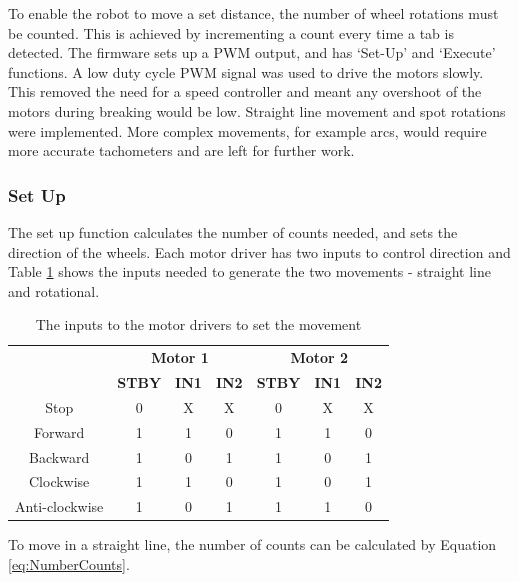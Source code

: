 To enable the robot to move a set distance, the number of wheel rotations must be counted. This is achieved by incrementing a count every time a tab is detected. The firmware sets up a PWM output, and has `Set-Up' and `Execute' functions. A low duty cycle PWM signal was used to drive the motors slowly. This removed the need for a speed controller and meant any overshoot of the motors during breaking would be low. Straight line movement and spot rotations were implemented. More complex movements, for example arcs, would require more accurate tachometers and are left for further work. %

\subsubsection{Set Up}
The set up function calculates the number of counts needed, and sets the direction of the wheels. Each motor driver has two inputs to control direction and Table \ref{table:MotorDirection} shows the inputs needed to generate the two movements - straight line and rotational. 

\begin{table}
\centering
\caption{The inputs to the motor drivers to set the movement}
\label{table:MotorDirection}
\begin{tabular}{ccccccc}\toprule
\multicolumn{1}{c}{ }&\multicolumn{3}{c}{\textbf{Motor 1}}&\multicolumn{3}{c}{\textbf{Motor 2}}\\ \cmidrule(r){2-4} \cmidrule(l){5-7}
\multicolumn{1}{c}{ }	&	\textbf{STBY} 	&	\textbf{IN1}	& \textbf{IN2} 	& \textbf{STBY} 	& \textbf{IN1} 	& \textbf{IN2}	\\ \toprule
Stop					&	0		&	X	&	X	&	0	&	X	&	X	\\ \midrule
Forward					&	1		&	1	&	0	&	1	&	1	&	0	\\ \midrule
Backward				&	1		&	0	&	1	&	1	&	0	&	1	\\ \midrule
Clockwise				&	1		&	1	&	0	&	1	&	0	&	1	\\ \midrule
Anti-clockwise 			&	1		&	0	&	1	&	1	&	1	&	0	\\\bottomrule
\end{tabular}

\end{table}

To move in a straight line, the number of counts can be calculated by Equation \eqref{eq:NumberCounts}. 

